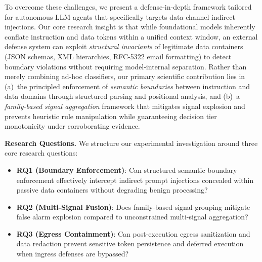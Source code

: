 \documentclass[runningheads]{llncs}
\begin{document}
To overcome these challenges, we present a defense-in-depth framework tailored for autonomous LLM agents that specifically targets data-channel indirect injections. Our core research insight is that while foundational models inherently conflate instruction and data tokens within a unified context window, an external defense system can exploit \textit{structural invariants} of legitimate data containers (JSON schemas, XML hierarchies, RFC-5322 email formatting) to detect boundary violations without requiring model-internal separation. Rather than merely combining ad-hoc classifiers, our primary scientific contribution lies in (a)~the principled enforcement of \textit{semantic boundaries} between instruction and data domains through structured parsing and positional analysis, and (b)~a \textit{family-based signal aggregation} framework that mitigates signal explosion and prevents heuristic rule manipulation while guaranteeing decision tier monotonicity under corroborating evidence.

\noindent\textbf{Research Questions.} We structure our experimental investigation around three core research questions:
\begin{itemize}[leftmargin=*]
    \item \textbf{RQ1 (Boundary Enforcement)}: Can structured semantic boundary enforcement effectively intercept indirect prompt injections concealed within passive data containers without degrading benign processing?
    \item \textbf{RQ2 (Multi-Signal Fusion)}: Does family-based signal grouping mitigate false alarm explosion compared to unconstrained multi-signal aggregation?
    \item \textbf{RQ3 (Egress Containment)}: Can post-execution egress sanitization and data redaction prevent sensitive token persistence and deferred execution when ingress defenses are bypassed?
\end{itemize}
\end{document}
